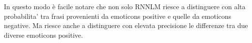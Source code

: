 \documentclass[a4paper,12pt,openright,twoside]{report}
\theoremstyle{definition}
\begin{document}
In questo modo è facile notare che non solo RNNLM riesce a distinguere con alta probabilita'  tra frasi provenienti da emoticons positive e quelle da emoticons negative. 
Ma riesce anche a distinguere con elevata precisione le differenze tra due diverse emoticons positive.
\fi
\end{document}
